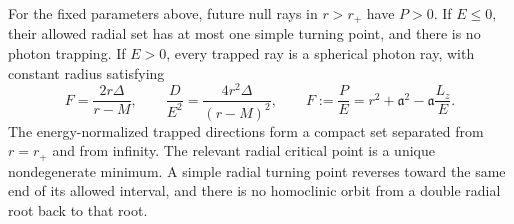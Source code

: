 \begin{lemma}
\label{geo:radial}
For the fixed parameters above, future null rays in $r>r_+$ have $P>0$.
If $E\leq0$, their allowed radial set has at most one simple turning
point, and there is no photon trapping.  If $E>0$, every trapped ray is a
spherical photon ray, with constant radius satisfying
\begin{equation}
 F=\frac{2r\Delta}{r-M},\qquad
 \frac{D}{E^2}=\frac{4r^2\Delta}{(r-M)^2},\qquad
 F:=\frac PE=r^2+\mathfrak a^2-\mathfrak a\frac{L_z}{E}.
 \label{geo:double-root}
\end{equation}
The energy-normalized trapped directions form a compact set separated
from $r=r_+$ and from infinity.  The relevant radial critical point is a
unique nondegenerate minimum.  A simple radial turning point reverses
toward the same end of its allowed interval, and there is no homoclinic
orbit from a double radial root back to that root.
\end{lemma}

